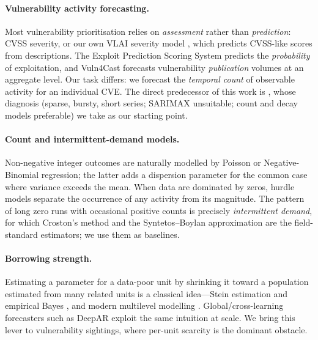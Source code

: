 \documentclass[]{article}
\begin{document}
\paragraph{Vulnerability activity forecasting.} Most vulnerability prioritisation
relies on \emph{assessment} rather than \emph{prediction}: CVSS severity, or our
own VLAI severity model \cite{bonhomme2025vlairobertabasedmodelautomated}, which
predicts CVSS-like scores from descriptions. The Exploit Prediction Scoring System
\cite{jacobs2023enhancingvulnerabilityprioritizationdatadriven} predicts the
\emph{probability} of exploitation, and Vuln4Cast \cite{10.1145/3492328} forecasts
vulnerability \emph{publication} volumes at an aggregate level. Our task differs:
we forecast the \emph{temporal count} of observable activity for an individual
CVE. The direct predecessor of this work is \cite{bonhomme2026modeling}, whose
diagnosis (sparse, bursty, short series; SARIMAX unsuitable; count and decay
models preferable) we take as our starting point.

\paragraph{Count and intermittent-demand models.} Non-negative integer outcomes
are naturally modelled by Poisson or Negative-Binomial regression; the latter adds
a dispersion parameter for the common case where variance exceeds the mean. When
data are dominated by zeros, hurdle models \cite{mullahy1986specification} separate
the occurrence of any activity from its magnitude. The pattern of long zero runs
with occasional positive counts is precisely \emph{intermittent demand}, for which
Croston's method \cite{croston1972forecasting} and the Syntetos--Boylan
approximation \cite{syntetos2005accuracy} are the field-standard estimators; we use
them as baselines.

\paragraph{Borrowing strength.} Estimating a parameter for a data-poor unit by
shrinking it toward a population estimated from many related units is a classical
idea---Stein estimation and empirical Bayes \cite{efron1975data}, and modern
multilevel modelling \cite{gelman2007data}. Global/cross-learning forecasters such
as DeepAR \cite{salinas2020deepar} exploit the same intuition at scale. We bring
this lever to vulnerability sightings, where per-unit scarcity is the dominant
obstacle.
\end{document}
